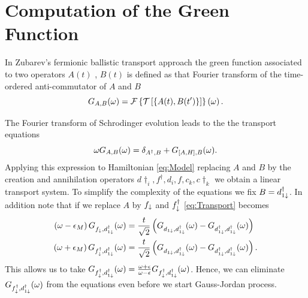 \documentclass[showpacs,aps,prb,reprint,superscriptaddress]{revtex4-1}
\begin{document}



%




 \appendix

 
 \section{Computation of the Green Function \label{sec:Appendix_alg}}
 In Zubarev's fermionic ballistic transport approach \cite{zubarev_double-time_1960} the green function associated to two operators $A(t)$ , $B(t)$ is defined as that Fourier transform of the time-ordered anti-commutator of $A$ and $B$
\begin{equation}
  G_{A,B}(\omega)= \mathcal{F}\left\{ \mathcal{T}\left[\left\{ A(t),B(t')\right\} \right]\right\} \left(\omega\right).
  \label{eq:greenFunction}
\end{equation}

The Fourier transform of Schrodinger evolution leads to the the transport equations 
\begin{equation}
    \omega G_{A,B}(\omega)=\delta_{A^{\dagger},B}+G_{\left[A,H\right],B}(\omega).
    \label{eq:Transport}
\end{equation}
\noindent Applying this expression to Hamiltonian \eqref{eq:Model} replacing $A$ and $B$ by the creation and annihilation operators $d\dagger_i, f^\dagger, d_i,f ,c_k,c\dagger_k$ we obtain a linear transport system. To simplify the complexity of the equations we fix $B = d^\dagger_{1\downarrow}$. In addition note that if we replace $A$ by $f_\downarrow$ and $f^\dagger_\downarrow$ \ref{eq:Transport} becomes
\begin{align}
        \left(\omega-\epsilon_{M}\right)G_{f_{\downarrow},d_{1\downarrow}^{\dagger}}(\omega)&=\frac{t}{\sqrt{2}}\left(G_{d_{1\downarrow},d_{1\downarrow}^{\dagger}}(\omega)-G_{d_{1\downarrow}^{\dagger},d_{1\downarrow}^{\dagger}}(\omega)\right) \\
    \left(\omega+\epsilon_{M}\right)G_{f_{\downarrow}^{\dagger},d_{1\downarrow}^{\dagger}}(\omega)&=\frac{t}{\sqrt{2}}\left(G_{d_{1\downarrow},d_{1\downarrow}^{\dagger}}(\omega)-G_{d_{1\downarrow}^{\dagger},d_{1\downarrow}^{\dagger}}(\omega)\right).
\end{align}
\noindent This allows us to take $G_{f_{\downarrow}^{\dagger},d_{1\downarrow}^{\dagger}}(\omega) = \frac{\omega + \epsilon}{\omega -\epsilon}G_{f_{\downarrow}^{\dagger},d_{1\downarrow}^{\dagger}}(\omega) $. Hence, we can eliminate $G_{f_{\downarrow}^{\dagger},d_{1\downarrow}^{\dagger}}(\omega) $ from the equations even before we start Gauss-Jordan process.
\end{document}
